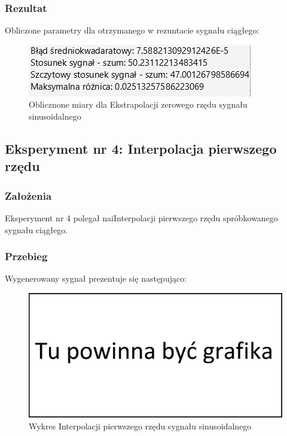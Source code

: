 \documentclass[12pt]{article}
\begin{document}
\subsubsection{Rezultat}
Obliczone parametry dla otrzymanego w rezuntacie sygnału ciągłego:
\begin{figure}[H]
    \centering
	\includegraphics[width=\linewidth]{wyniki_rekonstrukcja_zero.jpg}
    \caption{Oblicznone miary dla Ekstrapolacji zerowego rzędu sygnału sinusoidalnego}
    \label{wartości dla eksperymentu 3}
\end{figure}



\newpage
\subsection{Eksperyment nr 4: Interpolacja pierwszego rzędu}

\subsubsection{Założenia}
Eksperyment nr 4 polegał naiInterpolacji pierwszego rzędu spróbkowanego sygnału ciągłego.
\subsubsection{Przebieg}
Wygenerowany sygnał prezentuje się następująco:
\begin{figure}[H]
	\centering
	\includegraphics[width=\linewidth]{tmp.jpg}
	\caption{Wykres Interpolacji pierwszego rzędu sygnału sinusoidalnego}
	\label{wykres dla eksperymentu 4}
\end{figure}
\end{document}
